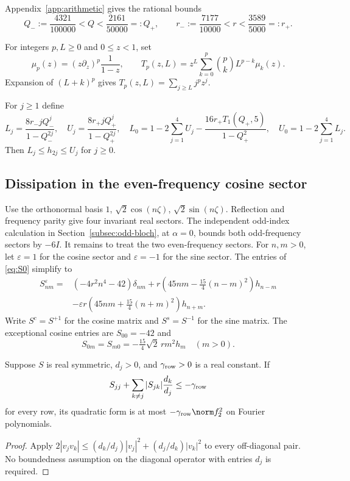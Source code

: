 Appendix~\ref{app:arithmetic} gives the rational bounds
\begin{equation}\label{eq:endpoints}
 Q_-:=\frac{4321}{100000}<Q<\frac{2161}{50000}=:Q_+,
 \qquad r_-:=\frac{7177}{10000}<r<\frac{3589}{5000}=:r_+.
\end{equation}


For integers $p,L\ge0$ and $0\le z<1$, set
\begin{equation}\label{eq:moments}
 \mu_p(z)=(z\partial_z)^p\frac1{1-z},\qquad
 T_p(z,L)=z^L\sum_{k=0}^p\binom pk L^{p-k}\mu_k(z).
\end{equation}
Expansion of $(L+k)^p$ gives $T_p(z,L)=\sum_{j\ge L}j^pz^j$.

For $j\ge1$ define
\begin{equation}\label{eq:L-U}
 L_j=\frac{8r_-jQ_-^j}{1-Q_-^{2j}},\quad
 U_j=\frac{8r_+jQ_+^j}{1-Q_+^{2j}},\quad
 L_0=1-2\sum_{j=1}^4U_j-\frac{16r_+T_1(Q_+,5)}{1-Q_+^2},\quad
 U_0=1-2\sum_{j=1}^4L_j.
\end{equation}
Then $L_j\le h_{2j}\le U_j$ for $j\ge0$.

\subsection{Dissipation in the even-frequency cosine sector}
Use the orthonormal basis $1$, $\sqrt2\cos(n\zeta)$, $\sqrt2\sin(n\zeta)$. Reflection and frequency parity give four invariant real sectors. The independent odd-index calculation in Section~\ref{subsec:odd-bloch}, at $\alpha=0$, bounds both odd-frequency sectors by $-6I$. It remains to treat the two even-frequency sectors. For $n,m>0$, let $\varepsilon=1$ for the cosine sector and $\varepsilon=-1$ for the sine sector. The entries of \eqref{eq:S0} simplify to
\begin{align}
 S^\varepsilon_{nm}={}&(-4r^2n^4-42)\delta_{nm}
 +r\left(45nm-\tfrac{15}{4}(n-m)^2\right)h_{n-m}\nonumber\\
 &-\varepsilon r\left(45nm+\tfrac{15}{4}(n+m)^2\right)h_{n+m}.\label{eq:entries}
\end{align}
Write $S^c=S^{+1}$ for the cosine matrix and $S^s=S^{-1}$ for the sine matrix. The exceptional cosine entries are $S_{00}=-42$ and
\begin{equation}\label{eq:zero}
 S_{0m}=S_{m0}=-\tfrac{15}{4}\sqrt2\,r m^2h_m\quad(m>0).
\end{equation}


\begin{lemma}\label{lem:row}
Suppose $S$ is real symmetric, $d_j>0$, and $\gamma_{\rm row}>0$ is a real constant. If
\[
 S_{jj}+\sum_{k\ne j}|S_{jk}|\frac{d_k}{d_j}\le-\gamma_{\rm row}
\]
for every row, its quadratic form is at most $-\gamma_{\rm row}\norm f_2^2$ on Fourier polynomials.
\end{lemma}
\begin{proof}
Apply $2|v_jv_k|\le(d_k/d_j)|v_j|^2+(d_j/d_k)|v_k|^2$ to every off-diagonal pair. No boundedness assumption on the diagonal operator with entries $d_j$ is required.
\end{proof}

